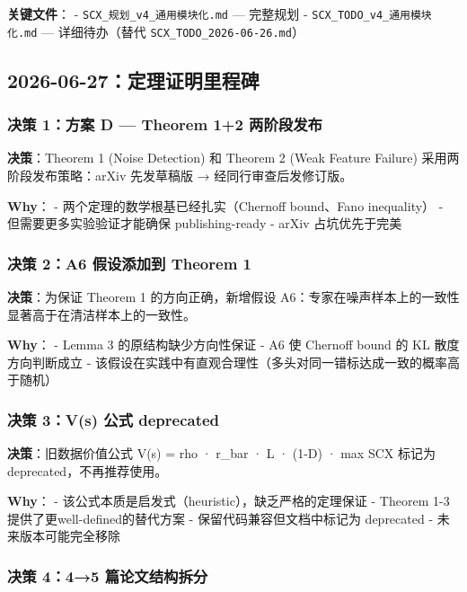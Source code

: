 \documentclass[
  12pt,
]{ctexart}
\begin{document}
\textbf{关键文件}： - \texttt{SCX\_规划\_v4\_通用模块化.md} --- 完整规划
- \texttt{SCX\_TODO\_v4\_通用模块化.md} --- 详细待办（替代
\texttt{SCX\_TODO\_2026-06-26.md}）

\subsection{2026-06-27：定理证明里程碑}\label{ux5b9aux7406ux8bc1ux660eux91ccux7a0bux7891}

\subsubsection{决策 1：方案 D --- Theorem 1+2
两阶段发布}\label{ux51b3ux7b56-1ux65b9ux6848-d-theorem-12-ux4e24ux9636ux6bb5ux53d1ux5e03}

\textbf{决策}：Theorem 1 (Noise Detection) 和 Theorem 2 (Weak Feature
Failure) 采用两阶段发布策略：arXiv 先发草稿版 → 经同行审查后发修订版。

\textbf{Why}： - 两个定理的数学根基已经扎实（Chernoff bound、Fano
inequality） - 但需要更多实验验证才能确保 publishing-ready - arXiv
占坑优先于完美

\subsubsection{决策 2：A6 假设添加到 Theorem
1}\label{ux51b3ux7b56-2a6-ux5047ux8bbeux6dfbux52a0ux5230-theorem-1}

\textbf{决策}：为保证 Theorem 1 的方向正确，新增假设
A6：专家在噪声样本上的一致性显著高于在清洁样本上的一致性。

\textbf{Why}： - Lemma 3 的原结构缺少方向性保证 - A6 使 Chernoff bound
的 KL 散度方向判断成立 -
该假设在实践中有直观合理性（多头对同一错标达成一致的概率高于随机）

\subsubsection{决策 3：V(s) 公式
deprecated}\label{ux51b3ux7b56-3vs-ux516cux5f0f-deprecated}

\textbf{决策}：旧数据价值公式 V(s) = rho · r\_bar · L · (1-D) · max SCX
标记为 deprecated，不再推荐使用。

\textbf{Why}： - 该公式本质是启发式（heuristic），缺乏严格的定理保证 -
Theorem 1-3 提供了更well-defined的替代方案 - 保留代码兼容但文档中标记为
deprecated - 未来版本可能完全移除

\subsubsection{决策 4：4→5
篇论文结构拆分}\label{ux51b3ux7b56-445-ux7bc7ux8bbaux6587ux7ed3ux6784ux62c6ux5206}
\end{document}
